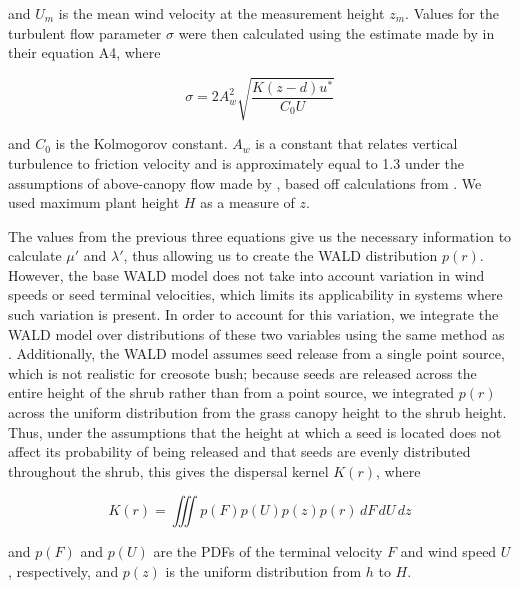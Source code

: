 \documentclass[11pt]{article}\usepackage[]{graphicx}\usepackage[usenames,dvipsnames]{xcolor}
\begin{document}
and $U_{m}$ is the mean wind velocity at the measurement height $z_{m}$.
Values for the turbulent flow parameter $\sigma$ were then calculated using the estimate made by \citet{skarpaas2007dispersal} in their equation A4, where 

\begin{linenomath*} \begin{equation} \sigma = 2A_{w}^2 \sqrt{\frac{K(z-d)u^*}{C_{0}U}} \end{equation} 
\end{linenomath*} 

and $C_{0}$ is the Kolmogorov constant.
$A_{w}$ is a constant that relates vertical turbulence to friction velocity and is approximately equal to 1.3 under the assumptions of above-canopy flow made by \citet{skarpaas2007dispersal}, based off calculations from \citet{hsieh1997dissipation}.
We used maximum plant height $H$ as a measure of $z$.

The values from the previous three equations give us the necessary information to calculate $\mu'$ and $\lambda'$, thus allowing us to create the WALD distribution $p(r)$.
However, the base WALD model does not take into account variation in wind speeds or seed terminal velocities, which limits its applicability in systems where such variation is present.
In order to account for this variation, we integrate the WALD model over distributions of these two variables using the same method as \citet{skarpaas2007dispersal}.
Additionally, the WALD model assumes seed release from a single point source, which is not realistic for creosote bush; because seeds are released across the entire height of the shrub rather than from a point source, we integrated $p(r)$ across the uniform distribution from the grass canopy height to the shrub height.
Thus, under the assumptions that the height at which a seed is located does not affect its probability of being released and that seeds are evenly distributed throughout the shrub, this gives the dispersal kernel $K(r)$, where

\begin{linenomath*} \begin{equation} K(r) = \iiint p(F)p(U)p(z)p(r) \,dF\,dU\,dz \end{equation} 
\end{linenomath*} 

and $p(F)$ and $p(U)$ are the PDFs of the terminal velocity $F$ and wind speed $U$, respectively, and $p(z)$ is the uniform distribution from $h$ to $H$.
\end{document}
